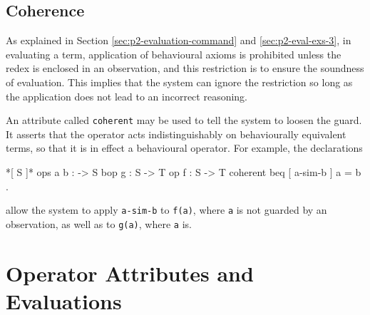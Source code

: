 \documentclass[a4paper]{memoir}
\begin{document}
\subsection{Coherence} \label{sec:p2-coherence}

As explained in Section \ref{sec:p2-evaluation-command} and
\ref{sec:p2-eval-exs-3},
in evaluating a term, application of behavioural axioms is prohibited
unless the redex is enclosed in an observation, and
this restriction is to ensure the soundness of evaluation.
This implies that the system can ignore the restriction
so long as the application does not lead to an incorrect reasoning.

An attribute called \verb|coherent| may be used to tell the system
to loosen the guard. It asserts that the operator acts
indistinguishably on behaviourally equivalent terms, so that
it is in effect a behavioural operator.
For example, the declarations
\begin{vvtm}
\begin{ccode}
  [ T ]
  *[ S ]*
  ops a b : -> S
  bop g : S -> T
  op f : S -> T { coherent }
  beq [ a-sim-b ] a = b .
\end{ccode}
\end{vvtm}
allow the system to apply \verb|a-sim-b| to \verb|f(a)|, where \verb|a|
is not guarded by an observation, as well as to \verb|g(a)|, where
\verb|a| is.

\section{Operator Attributes and Evaluations}\label{sec:p2-op-attr-eval}
\end{document}
